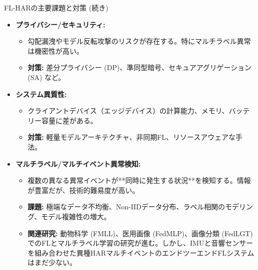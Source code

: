 \documentclass[unicode,12pt,aspectratio=169, dvipdfmx]{beamer}
\begin{document}
\begin{frame}{FL-HARの主要課題と対策 (続き)}
\begin{itemize}
    \item \textbf{プライバシー/セキュリティ:}
    \begin{itemize}
        \item 勾配漏洩やモデル反転攻撃のリスクが存在する。特にマルチラベル異常は機密性が高い。
        \item \textbf{対策:} 差分プライバシー (DP)、準同型暗号、セキュアアグリゲーション (SA) など。
    \end{itemize}
    \item \textbf{システム異質性:}
    \begin{itemize}
        \item クライアントデバイス（エッジデバイス）の計算能力、メモリ、バッテリー容量に差がある。
        \item \textbf{対策:} 軽量モデルアーキテクチャ、非同期FL、リソースアウェアな手法。
    \end{itemize}
    \item \textbf{マルチラベル/マルチイベント異常検知:}
    \begin{itemize}
        \item 複数の異なる異常イベントが**同時に発生する状況**を検知する。情報が豊富だが、技術的難易度が高い。
        \item \textbf{課題:} 極端なデータ不均衡、Non-IIDデータ分布、ラベル相関のモデリング、モデル複雑性の増大。
        \item \textbf{関連研究:} 動物科学 (FMLL)、医用画像 (FedMLP)、画像分類 (FedLGT) でのFLとマルチラベル学習の研究が進む。しかし、IMUと音響センサーを組み合わせた異種HARマルチイベントのエンドツーエンドFLシステムはまだ少ない。
    \end{itemize}
\end{itemize}
\end{frame}
\end{document}
